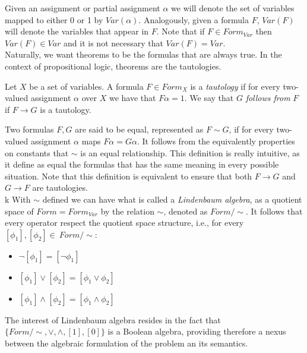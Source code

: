 Given an assignment or partial assignment $\alpha$ we will denote the set of variables mapped to either 0 or 1 by $Var(\alpha)$. Analogously, given a formula $F$, $Var(F)$ will denote the variables that appear in $F$. Note that if $F\in Form_{Var}$ then $Var(F)\in Var$ and it is not necessary that $Var(F)=Var$.\\

Naturally, we want theorems to be the formulas that are always true. In the context of propositional logic, theorems are the tautologies.   

  \begin{definition}
    Let $X$ be a set of variables. A formula $F\in Form_X$ is a \emph{tautology} if for every two-valued assignment $\alpha$ over $X$ we have that $F\alpha=1$. We say that $G$ \emph{follows from} $F$ if $F\to G$ is a tautology. 
  \end{definition}


  
Two formulas $F,G$ are said to be equal, represented as $F\sim G$, if for every two-valued assignment $\alpha$ maps $F\alpha = G\alpha$. It follows from the equivalently properties on constants that $\sim$ is an equal relationship. This definition is really intuitive, as it define as equal the formulas that has the same meaning in every possible situation. Note that this definition is equivalent to ensure that both $F\to G$ and $G\to F$ are tautologies.\\


k
\label{def:linden}
With $\sim$ defined we can have what is called a \emph{Lindenbaum algebra}, as a quotient space of $Form = Form_{Var}$ by the relation $\sim$, denoted as $Form/\sim$. It follows that every operator respect the quotient space structure, i.e., for every $[\phi_1],[\phi_2]\in\ Form/\sim$:

\begin{itemize}
\item $\neg [\phi_1] = [\neg\phi_1]$
\item $ [\phi_1] \vee [\phi_2]= [\phi_1 \vee \phi_2]$
\item $ [\phi_1] \wedge [\phi_2]= [\phi_1 \wedge \phi_2]$
\end{itemize}

The interest of Lindenbaum algebra resides in the fact that $\{Form/\sim, \vee,\wedge,[1],[0]\}$ is a Boolean algebra, providing therefore a nexus between the algebraic formulation of the problem an its semantics.











